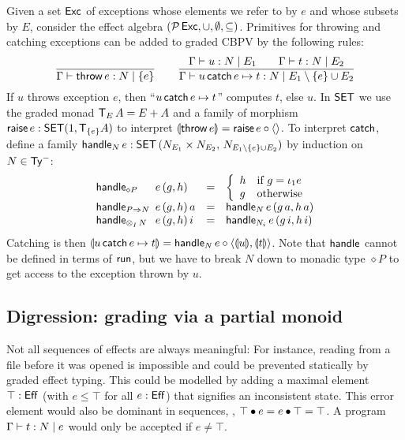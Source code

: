 \documentclass[acmsmall,review,anonymous]{acmart}\settopmatter{printfolios=true,printccs=false,printacmref=false}
\theoremstyle{remark}
\begin{document}
Given a set $\Exc$ of exceptions whose elements we refer to by $e$ and whose subsets by $E$,
consider the effect algebra $(\Pot\Exc,\cup,\emptyset,\subseteq)$.
Primitives for throwing and catching exceptions can be added to graded
CBPV by the following rules:
\newcommand{\eee}{E_1\setminus\{e\} \cup E_2}
\[
  \ru{}{\CompTy \Gamma {\throw e} {\{e\}} N} %
\qquad
  \ru{\CompTy \Gamma u {E_1} N \qquad
      \CompTy \Gamma t {E_2} N
    }{\CompTy \Gamma {\catch u e t} {\eee} N}
\]
If $u$ throws exception $e$, then ``$\catch u e t$'' computes $t$, else $u$.
%
In $\SET$ we use the graded monad $\T[E]\,A = E + A$ and a family of
morphism $\traise\,e : \SET(1,\T[\{e\}]A)$ to interpret
$\dent{\throw e} = \traise\,e \comp \langle\rangle$.  To interpret
$\tcatch$, define a family
$\thandle[N]\,e : \Hom[\SET] {N_{E_1} \times N_{E_2}} {N_{\eee}}$ by
induction on $N \in \NTy$:
\[
\begin{array}{l@{~}lcl}
  \handle[\diamond P] {&e} g h & = & \left\{
                                  \begin{array}{ll}
                                    h & \mbox{if } g = \iota_1 e \\
                                    g & \mbox{otherwise}
                                  \end{array}
\right. \\
  \handle[P \To N] {&e} g h \, a & = & \handle[N] e {g\,a} {h\,a} \\
  \handle[\tupt I N] {&e} g h \, i & = & \handle[N_i] e {g\,i} {h\,i} \\
\end{array}
\]
Catching is then
$\dent {\catch u e t} = \thandle[N]\,e \comp \langle \dent u, \dent t
\rangle$.
Note that $\thandle$ cannot be defined in terms of $\trun$, but we
have to break $N$ down to monadic type $\diamond P$
to get access to the exception
thrown by $u$.


\subsection{Digression: grading via a partial monoid}

Not all sequences of effects are always meaningful: For instance,
reading from a file before it was opened is impossible and could be
prevented statically by graded effect typing.  This could be modelled
by adding a maximal element $\top : \Eff$ (with $e \leq \top$ for all
$e : \Eff$) that signifies an inconsistent state.  This error element
would also be dominant in sequences, \ie,
$\top \bu e = e \bu \top = \top$.
A program $\CompTy \Gamma t e N$ would only be accepted if $e \not= \top$.
\end{document}
